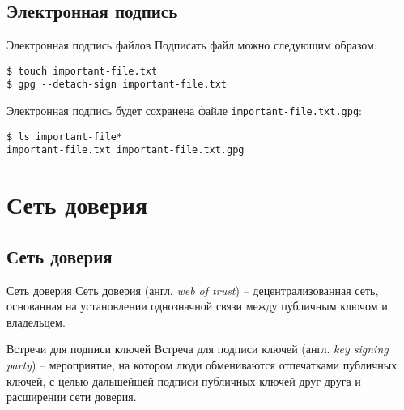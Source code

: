 \documentclass[presentation]{beamer}
\begin{document}


\subsection{Электронная подпись}

\begin{frame}[fragile]{Электронная подпись файлов}
  Подписать файл можно следующим образом:
\begin{verbatim}
$ touch important-file.txt
$ gpg --detach-sign important-file.txt
\end{verbatim}

  Электронная подпись будет сохранена файле
  \texttt{important-file.txt.gpg}:
\begin{verbatim}
$ ls important-file*
important-file.txt important-file.txt.gpg
\end{verbatim}
\end{frame}





\section{Сеть доверия}

\subsection{Сеть доверия}

\begin{frame}{Сеть доверия}
  \raisebox{-.30em}{\Large\HandRight}\hspace{.25em} Сеть доверия
  (англ. \emph{web of trust}) -- децентрализованная сеть, основанная
  на установлении однозначной связи между публичным ключом и
  владельцем.
\end{frame}

\begin{frame}{Встречи для подписи ключей}
  \raisebox{-.30em}{\Large\HandRight}\hspace{.25em} Встреча для
  подписи ключей (англ. \emph{key signing party}) -- мероприятие, на
  котором люди обмениваются отпечатками публичных ключей, с целью
  дальшейшей подписи публичных ключей друг друга и расширении сети
  доверия.
\end{frame}
\end{document}
